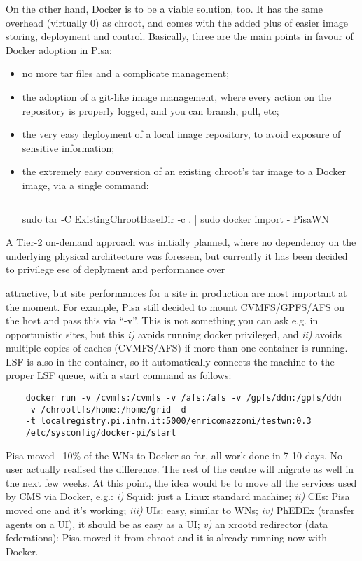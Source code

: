 \documentclass{PoS}
\begin{document}
On the other hand, Docker is to be a viable solution, too. It has the same overhead (virtually 0) as chroot, and comes with the added plus of easier image storing, deployment and control. Basically, three are the main points in favour of Docker adoption in Pisa: 
\begin{itemize}
\item no more tar files and a complicate management;
\item the adoption of a git-like image management, where every action on the repository is properly logged, and you can bransh, pull, etc;
\item the very easy deployment of a local image repository, to avoid exposure of sensitive information;
\item the extremely easy conversion of an existing chroot's tar image to a Docker image, via a single command:
\begin{verbatim}
\end{verbatim}
    sudo tar -C ExistingChrootBaseDir -c . | sudo docker import - PisaWN
\end{itemize}

A Tier-2 on-demand approach was initially planned, where no dependency on the underlying physical architecture was foreseen, but currently it has been decided to privilege ese of deplyment and performance over 

attractive, but site performances for a site in production are most important at the moment. For example, Pisa still decided to mount CVMFS/GPFS/AFS on the host and pass this via ``-v''. This is not something you can ask e.g. in opportunistic sites, but this {\em i)} avoids running docker privileged, and {\em ii)}
avoids multiple copies of caches (CVMFS/AFS) if more than one container is running. LSF is also in the container, so it automatically connects the machine to the proper LSF queue, with a start command as follows:
%
\begin{verbatim}
    docker run -v /cvmfs:/cvmfs -v /afs:/afs -v /gpfs/ddn:/gpfs/ddn
    -v /chrootlfs/home:/home/grid -d
    -t localregistry.pi.infn.it:5000/enricomazzoni/testwn:0.3
    /etc/sysconfig/docker-pi/start
\end{verbatim}
%
Pisa moved ~10\% of the WNs to Docker so far, all work done in 7-10 days. No user actually realised the difference. The rest of the centre will migrate as well in the next few weeks. At this point, the idea would be to move all the services used by CMS via Docker, e.g.: {\em i)} Squid: just a Linux standard machine; {\em ii)} CEs: Pisa moved one and it’s working; {\em iii)} UIs: easy, similar to WNs; {\em iv)} PhEDEx (transfer agents on a UI), it should be as easy as a UI; {\em v)} an xrootd redirector (data federations): Pisa moved it from chroot and it is already running now with Docker.
\end{document}
